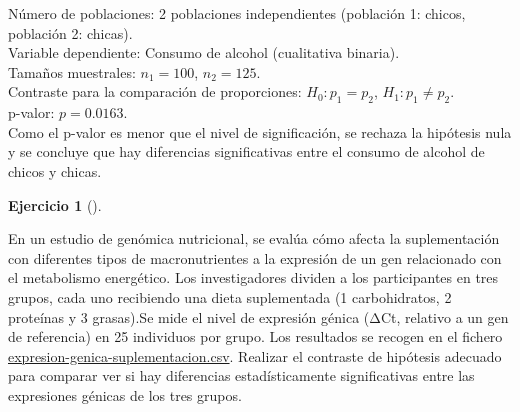 \documentclass[
  a4paper,
]{scrreport}
\theoremstyle{definition}
\newtheorem{exercise}{Ejercicio}[chapter]
\theoremstyle{remark}
\begin{document}
\begin{tcolorbox}[enhanced jigsaw, opacityback=0, colback=white, breakable, toprule=.15mm, colframe=quarto-callout-tip-color-frame, coltitle=black, opacitybacktitle=0.6, leftrule=.75mm, colbacktitle=quarto-callout-tip-color!10!white, bottomtitle=1mm, bottomrule=.15mm, rightrule=.15mm, titlerule=0mm, arc=.35mm, title=\textcolor{quarto-callout-tip-color}{\faLightbulb}\hspace{0.5em}{Solución}, toptitle=1mm, left=2mm]

Número de poblaciones: 2 poblaciones independientes (población 1:
chicos, población 2: chicas).\\
Variable dependiente: Consumo de alcohol (cualitativa binaria).\\
Tamaños muestrales: \(n_1=100\), \(n_2=125\).\\
Contraste para la comparación de proporciones: \(H_0:p_1=p_2\),
\(H_1:p_1\neq p_2\).\\
p-valor: \(p=0.0163\).\\
Como el p-valor es menor que el nivel de significación, se rechaza la
hipótesis nula y se concluye que hay diferencias significativas entre el
consumo de alcohol de chicos y chicas.

\end{tcolorbox}

\begin{exercise}[]\protect\hypertarget{exr-contraste-anova-suplementacion}{}\label{exr-contraste-anova-suplementacion}

En un estudio de genómica nutricional, se evalúa cómo afecta la
suplementación con diferentes tipos de macronutrientes a la expresión de
un gen relacionado con el metabolismo energético. Los investigadores
dividen a los participantes en tres grupos, cada uno recibiendo una
dieta suplementada (1 carbohidratos, 2 proteínas y 3 grasas).Se mide el
nivel de expresión génica (ΔCt, relativo a un gen de referencia) en 25
individuos por grupo. Los resultados se recogen en el fichero
\href{datos/expresion-genica-suplementacion.csv}{expresion-genica-suplementacion.csv}.
Realizar el contraste de hipótesis adecuado para comparar ver si hay
diferencias estadísticamente significativas entre las expresiones
génicas de los tres grupos.

\end{exercise}
\end{document}
